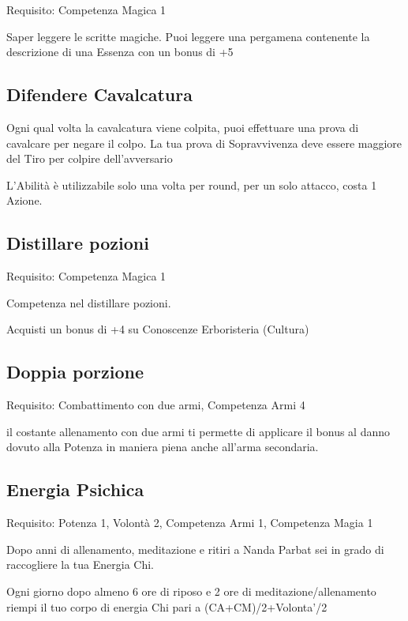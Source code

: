\documentclass[a4paper,11pt,twoside,openany]{book}
\begin{document}
Requisito: Competenza Magica 1

Saper leggere le scritte magiche. Puoi leggere una pergamena contenente la descrizione di una Essenza con un bonus di +5

\subsection{Difendere Cavalcatura}

Ogni qual volta la cavalcatura viene colpita, puoi effettuare una prova di cavalcare per negare il colpo. La tua prova di Sopravvivenza deve essere maggiore del Tiro per colpire dell'avversario

L'Abilità è utilizzabile solo una volta per round, per un solo attacco, costa 1 Azione.

\subsection{Distillare pozioni}

Requisito: Competenza Magica 1

Competenza nel distillare pozioni.

Acquisti un bonus di +4 su Conoscenze Erboristeria (Cultura)

\subsection{Doppia porzione}

Requisito: Combattimento con due armi, Competenza Armi 4

il costante allenamento con due armi ti permette di applicare il bonus al danno dovuto alla Potenza in maniera piena anche all'arma secondaria.

\subsection{Energia Psichica}

Requisito: Potenza 1, Volontà 2, Competenza Armi 1, Competenza Magia 1

Dopo anni di allenamento, meditazione e ritiri a Nanda Parbat sei in grado di raccogliere la tua Energia Chi.

Ogni giorno dopo almeno 6 ore di riposo e 2 ore di meditazione/allenamento riempi il tuo corpo di energia Chi pari a (CA+CM)/2+Volonta'/2
\end{document}
